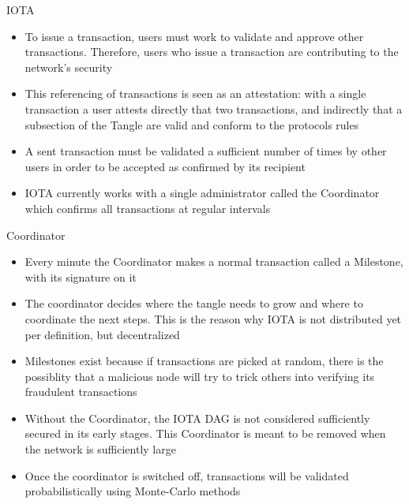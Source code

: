 \documentclass[10pt]{beamer}
\begin{document}

\begin{frame}{IOTA}
	\begin{itemize}
		\item To issue a transaction, users must work to validate and approve other transactions. Therefore, users who issue a transaction are contributing to the network's security
		\item This referencing of transactions is seen as an attestation: with a single transaction a user attests directly that two transactions, and indirectly that a subsection of the Tangle are valid and conform to the protocols rules
		\item A sent transaction must be validated a sufficient number of times by other users in order to be accepted as confirmed by its recipient
		\item IOTA currently works with a single administrator called the Coordinator which confirms all transactions at regular intervals
	\end{itemize}
\end{frame}


\begin{frame}{Coordinator}
	\begin{itemize}
		\item Every minute the Coordinator makes a normal transaction called a Milestone, with its signature on it
		\item The coordinator decides where the tangle needs to grow and where to coordinate the next steps. This is the reason why IOTA is not distributed yet per definition, but decentralized
		\item Milestones exist because if transactions are picked at random, there is the possiblity that a malicious node will try to trick others into verifying its fraudulent transactions
		\item Without the Coordinator, the IOTA DAG is not considered sufficiently secured in its early stages. This Coordinator is meant to be removed when the network is sufficiently large
		\item Once the coordinator is switched off, transactions will be validated probabilistically using Monte-Carlo methods
	\end{itemize}
\end{frame}

\end{document}
